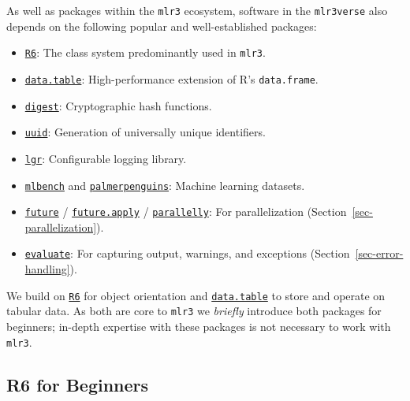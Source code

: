 As well as packages within the \texttt{mlr3} ecosystem, software in the
\texttt{mlr3verse} also depends on the following popular and
well-established packages:

\begin{itemize}
\tightlist
\item
  \href{https://cran.r-project.org/package=R6}{\texttt{R6}}: The class
  system predominantly used in \texttt{mlr3}.
\item
  \href{https://cran.r-project.org/package=data.table}{\texttt{data.table}}:
  High-performance extension of R's \texttt{data.frame}.
\item
  \href{https://cran.r-project.org/package=digest}{\texttt{digest}}:
  Cryptographic hash functions.
\item
  \href{https://cran.r-project.org/package=uuid}{\texttt{uuid}}:
  Generation of universally unique identifiers.
\item
  \href{https://cran.r-project.org/package=lgr}{\texttt{lgr}}:
  Configurable logging library.
\item
  \href{https://cran.r-project.org/package=mlbench}{\texttt{mlbench}}
  and
  \href{https://cran.r-project.org/package=palmerpenguins}{\texttt{palmerpenguins}}:
  Machine learning datasets.
\item
  \href{https://cran.r-project.org/package=future}{\texttt{future}} /
  \href{https://cran.r-project.org/package=future.apply}{\texttt{future.apply}}
  /
  \href{https://cran.r-project.org/package=parallelly}{\texttt{parallelly}}:
  For parallelization (Section~\ref{sec-parallelization}).
\item
  \href{https://cran.r-project.org/package=evaluate}{\texttt{evaluate}}:
  For capturing output, warnings, and exceptions
  (Section~\ref{sec-error-handling}).
\end{itemize}

We build on \href{https://cran.r-project.org/package=R6}{\texttt{R6}}
for object orientation and
\href{https://cran.r-project.org/package=data.table}{\texttt{data.table}}
to store and operate on tabular data. As both are core to \texttt{mlr3}
we \emph{briefly} introduce both packages for beginners; in-depth
expertise with these packages is not necessary to work with
\texttt{mlr3}.

\hypertarget{sec-r6}{%
\subsection{R6 for Beginners}\label{sec-r6}}

